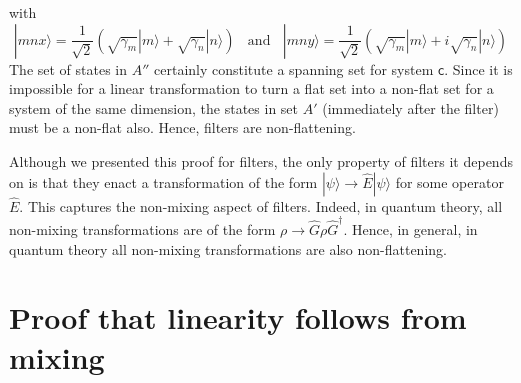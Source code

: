 \documentclass[10pt]{article}
\begin{document}
with
\begin{equation}
|{mnx}\rangle=\frac{1}{\sqrt{2}} (\sqrt{\gamma_m}|m\rangle+\sqrt{\gamma_n}|n\rangle)~~~~\text{and}~~~~ |{mny}\rangle=\frac{1}{\sqrt{2}} (\sqrt{\gamma_m}|m\rangle+i\sqrt{\gamma_n}|n\rangle)
\end{equation}
The set of states in $A''$ certainly constitute a spanning set for system $\mathsf c$.  Since it is impossible for a linear transformation to turn a flat set into a non-flat set for a system of the same dimension, the states in set $A'$ (immediately after the filter) must be a non-flat also.  Hence, filters are non-flattening.

Although we presented this proof for filters, the only property of filters it depends on is that they enact a transformation of the form $|\psi\rangle\rightarrow \hat E|\psi\rangle$ for some operator $\hat E$.  This captures the non-mixing aspect of filters.  Indeed, in quantum theory, all non-mixing transformations are of the form $\rho\rightarrow \hat G \rho \hat G^\dagger$.  Hence, in general, in quantum theory all non-mixing transformations are also non-flattening.



\section{Proof that linearity follows from mixing}\label{linearityfrommixing}
\end{document}
